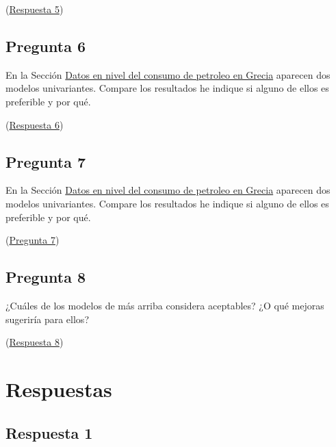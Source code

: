 \documentclass[10pt]{article}
\begin{document}
(\hyperref[sec:org0149f98]{Respuesta 5})
\subsection*{Pregunta 6}
\label{sec:orge17419d}

En la Sección \hyperref[sec:org38d97da]{Datos en nivel del consumo de petroleo en Grecia}
aparecen dos modelos univariantes. Compare los resultados he indique
si alguno de ellos es preferible y por qué.

(\hyperref[sec:org5d024f4]{Respuesta 6})
\subsection*{Pregunta 7}
\label{sec:org03d8c74}

En la Sección \hyperref[sec:org38d97da]{Datos en nivel del consumo de petroleo en Grecia}
aparecen dos modelos univariantes. Compare los resultados he indique
si alguno de ellos es preferible y por qué.

(\hyperref[sec:org03d8c74]{Pregunta 7})
\subsection*{Pregunta 8}
\label{sec:org787217f}

¿Cuáles de los modelos de más arriba considera aceptables? ¿O qué
mejoras sugeriría para ellos?

(\hyperref[sec:orge87796c]{Respuesta 8})
\section*{Respuestas}
\label{sec:orgb67f962}

\subsection*{Respuesta 1}
\label{sec:orge832e22}
\end{document}
